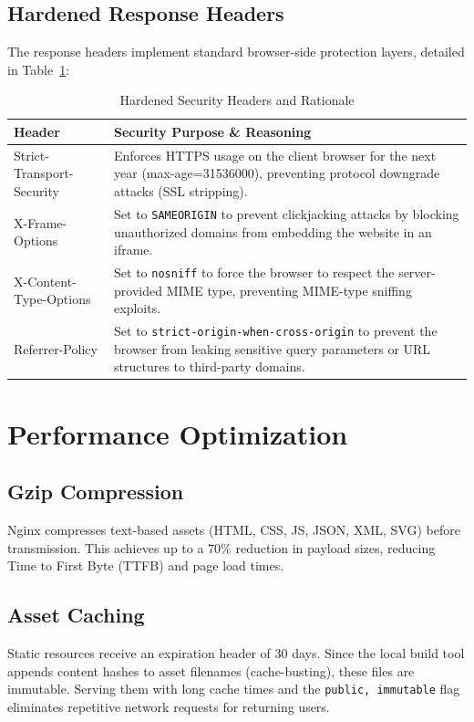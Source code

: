 \documentclass[11pt,a4paper,DIV=16,headings=normal,parskip=half]{scrartcl}
\begin{document}
\subsection{Hardened Response Headers}
The response headers implement standard browser-side protection layers, detailed in Table~\ref{tab:security_headers}:

\begin{table}[htbp]
\centering
\caption{Hardened Security Headers and Rationale}
\label{tab:security_headers}
\begin{tabular}{@{}lp{9cm}@{}}
\toprule
\textbf{Header} & \textbf{Security Purpose \& Reasoning} \\
\midrule
Strict-Transport-Security & Enforces HTTPS usage on the client browser for the next year (max-age=31536000), preventing protocol downgrade attacks (SSL stripping). \\
X-Frame-Options & Set to \texttt{SAMEORIGIN} to prevent clickjacking attacks by blocking unauthorized domains from embedding the website in an iframe. \\
X-Content-Type-Options & Set to \texttt{nosniff} to force the browser to respect the server-provided MIME type, preventing MIME-type sniffing exploits. \\
Referrer-Policy & Set to \texttt{strict-origin-when-cross-origin} to prevent the browser from leaking sensitive query parameters or URL structures to third-party domains. \\
\bottomrule
\end{tabular}
\end{table}

\section{Performance Optimization}

\subsection{Gzip Compression}
Nginx compresses text-based assets (HTML, CSS, JS, JSON, XML, SVG) before transmission. This achieves up to a 70\% reduction in payload sizes, reducing Time to First Byte (TTFB) and page load times.

\subsection{Asset Caching}
Static resources receive an expiration header of 30 days. Since the local build tool appends content hashes to asset filenames (cache-busting), these files are immutable. Serving them with long cache times and the \texttt{public, immutable} flag eliminates repetitive network requests for returning users.
\end{document}
